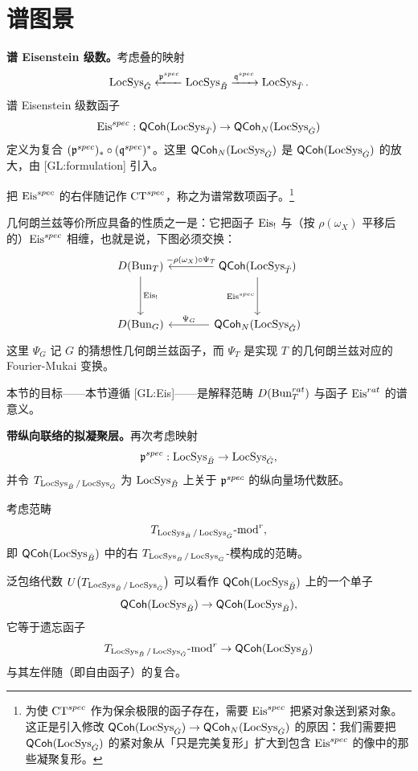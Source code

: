 \section{谱图景}

\textbf{谱 Eisenstein 级数。}考虑叠的映射
\[
  \operatorname{LocSys}_{\check G}\xleftarrow{\mathfrak{p}^{spec}}\operatorname{LocSys}_{\check B}\xrightarrow{\mathfrak{q}^{spec}}\operatorname{LocSys}_{\check T}.
\]
谱 Eisenstein 级数函子
\[
  \mathrm{Eis}^{spec} : \mathsf{QCoh}(\operatorname{LocSys}_{\check T})\to \mathsf{QCoh}_N(\operatorname{LocSys}_{\check G})
\]
定义为复合 $(\mathfrak{p}^{spec})_*\circ(\mathfrak{q}^{spec})^*$。这里 $\mathsf{QCoh}_N(\operatorname{LocSys}_{\check G})$ 是 $\mathsf{QCoh}(\operatorname{LocSys}_{\check G})$ 的放大，由 [GL:formulation] 引入。

把 $\mathrm{Eis}^{spec}$ 的右伴随记作 $\mathrm{CT}^{spec}$，称之为谱常数项函子。\footnote{为使 $\mathrm{CT}^{spec}$ 作为保余极限的函子存在，需要 $\mathrm{Eis}^{spec}$ 把紧对象送到紧对象。这正是引入修改 $\mathsf{QCoh}(\operatorname{LocSys}_{\check G})\to\mathsf{QCoh}_N(\operatorname{LocSys}_{\check G})$ 的原因：我们需要把 $\mathsf{QCoh}(\operatorname{LocSys}_{\check G})$ 的紧对象从「只是完美复形」扩大到包含 $\mathrm{Eis}^{spec}$ 的像中的那些凝聚复形。}

几何朗兰兹等价所应具备的性质之一是：它把函子 $\mathrm{Eis}_!$ 与（按 $\rho(\omega_X)$ 平移后的）$\mathrm{Eis}^{spec}$ 相缠，也就是说，下图必须交换：
\begin{equation}
\begin{tikzcd}[row sep=3.4em, column sep=3.6em, ampersand replacement=\&]
  D(\Bun_T) \& \QCoh(\LocSys_{\Ch T})
    \arrow[l, "-\rho(\omega_X)\circ\Psi_T"'] \\
  D(\Bun_G) \& \QCoh_N(\LocSys_{\Ch G})
    \arrow[l, "\Psi_G"']
    \arrow[from=1-1, to=2-1, "\Eis_!"]
    \arrow[from=1-2, to=2-2, "\Eis\st"']
\end{tikzcd}
\label{eq:4.1}
\end{equation}
这里 $\Psi_G$ 记 $G$ 的猜想性几何朗兰兹函子，而 $\Psi_T$ 是实现 $T$ 的几何朗兰兹对应的 Fourier-Mukai 变换。

本节的目标——本节遵循 [GL:Eis]——是解释范畴 $D(\operatorname{Bun}^{rat}_T)$ 与函子 $\mathrm{Eis}^{rat}$ 的谱意义。

\textbf{带纵向联络的拟凝聚层。}再次考虑映射
\[
  \mathfrak{p}^{spec} : \operatorname{LocSys}_{\check B}\to\operatorname{LocSys}_{\check G},
\]
并令 $T_{\operatorname{LocSys}_{\check B}/\operatorname{LocSys}_{\check G}}$ 为 $\operatorname{LocSys}_{\check B}$ 上关于 $\mathfrak{p}^{spec}$ 的纵向量场代数胚。

考虑范畴
\[
  T_{\operatorname{LocSys}_{\check B}/\operatorname{LocSys}_{\check G}}\text{-}\mathrm{mod}^r,
\]
即 $\mathsf{QCoh}(\operatorname{LocSys}_{\check B})$ 中的右 $T_{\operatorname{LocSys}_{\check B}/\operatorname{LocSys}_{\check G}}$-模构成的范畴。

泛包络代数 $U\bigl(T_{\operatorname{LocSys}_{\check B}/\operatorname{LocSys}_{\check G}}\bigr)$ 可以看作 $\mathsf{QCoh}(\operatorname{LocSys}_{\check B})$ 上的一个单子
\[
  \mathsf{QCoh}(\operatorname{LocSys}_{\check B})\to\mathsf{QCoh}(\operatorname{LocSys}_{\check B}),
\]
它等于遗忘函子
\[
  T_{\operatorname{LocSys}_{\check B}/\operatorname{LocSys}_{\check G}}\text{-}\mathrm{mod}^r\to\mathsf{QCoh}(\operatorname{LocSys}_{\check B})
\]
与其左伴随（即自由函子）的复合。

